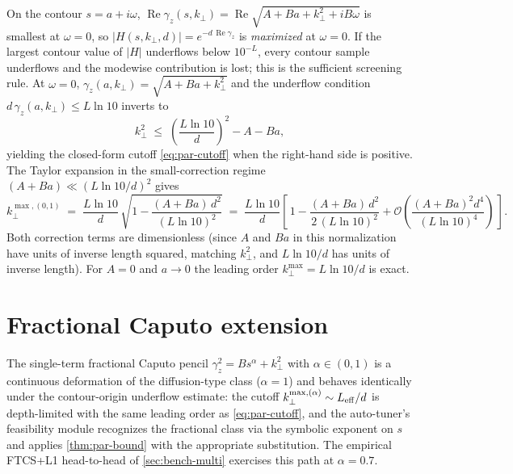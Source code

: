 \documentclass[manuscript,review]{acmart}
\newcommand{\kperp}{k_\perp}
\newcommand{\kpmax}[1][]{k_\perp^{\max#1}}
\newcommand{\gammaz}{\gamma_z}
\newcommand{\Real}{\operatorname{Re}}
\begin{document}
On the contour $s = a + i\omega$, $\Real\gammaz(s, \kperp)
= \Real\sqrt{A + Ba + \kperp^2 + i B \omega}$ is smallest at
$\omega = 0$, so $|H(s, \kperp, d)| = e^{-d\,\Real\gammaz}$ is
\emph{maximized} at $\omega = 0$. If the largest contour value of
$|H|$ underflows below $10^{-L}$, every contour sample
underflows and the modewise contribution is lost; this is the
sufficient screening rule. At $\omega = 0$,
$\gammaz(a, \kperp) = \sqrt{A + Ba + \kperp^2}$ and the
underflow condition $d\,\gammaz(a, \kperp) \le L \ln 10$
inverts to
\begin{equation}
\kperp^{2} \;\le\; \left(\frac{L\ln 10}{d}\right)^{2} - A - Ba,
\label{eq:par-cutoff-exact}
\end{equation}
yielding the closed-form cutoff \cref{eq:par-cutoff} when the
right-hand side is positive. The Taylor expansion in the
small-correction regime $(A + Ba) \ll (L\ln 10/d)^2$ gives
\[
\kpmax[,(0,1)]
\;=\;
\frac{L\ln 10}{d}\,\sqrt{1 - \frac{(A + Ba)\,d^{2}}{(L\ln 10)^{2}}}
\;=\;
\frac{L\ln 10}{d}\left[\,1 - \frac{(A + Ba)\,d^{2}}{2\,(L\ln 10)^{2}}
+ \mathcal{O}\!\left(\frac{(A + Ba)^{2} d^{4}}{(L\ln 10)^{4}}\right)\,\right].
\]
Both correction terms are dimensionless (since $A$ and $Ba$ in this
normalization have units of inverse length squared, matching
$\kperp^{2}$, and $L\ln 10/d$ has units of inverse length). For
$A = 0$ and $a \to 0$ the leading order $\kpmax = L\ln 10/d$ is
exact.

\section{Fractional Caputo extension}\label{sec:fractional-extension}

The single-term fractional Caputo pencil $\gammaz^2 = B s^\alpha +
\kperp^2$ with $\alpha \in (0, 1)$ is a continuous deformation of the
diffusion-type class ($\alpha = 1$) and behaves identically under the
contour-origin underflow estimate: the cutoff $\kpmax[,(\alpha)] \sim
L_{\rm eff}/d$ is depth-limited with the same leading order as
\cref{eq:par-cutoff}, and the auto-tuner's feasibility module
recognizes the fractional class via the symbolic exponent on $s$ and
applies \cref{thm:par-bound} with the appropriate substitution. The
empirical FTCS+L1 head-to-head of \cref{sec:bench-multi} exercises
this path at $\alpha = 0.7$.



\end{document}

